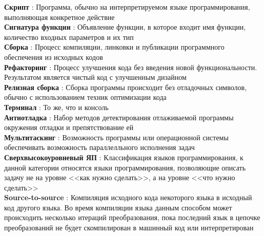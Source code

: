 \textbf{Скрипт}                  : Программа, обычно на интерпретируемом языке программирования, выполняющая конкретное действие                     \\
\textbf{Сигнатура функции}       : Объявление функции, в которое входит имя функции, количество входных параметров и их тип                          \\
\textbf{Сборка}                  : Процесс компиляции, линковки и публикации программного обеспечения из исходных кодов                              \\
\textbf{Рефакторинг}             : Процесс улучшения кода без введения новой функциональности. Результатом является чистый код с улучшенным дизайном \\
\textbf{Релизная сборка}         : Сборка программы происходит без отладочных символов, обычно с использованием техник оптимизации кода              \\
\textbf{Терминал}                : То же, что и консоль                                                                                              \\
\textbf{Антиотладка}             : Набор методов детектирования отлаживаемой программы окружения отладки и препятствование ей                        \\
\textbf{Мультитаскинг}           : Возможность программы или операционной системы обеспечивать возможность параллелльного исполнения задач           \\
\textbf{Сверхвысокоуровневый ЯП} : Классификация языков программирования, к данной категории относятся языки программирования,
позволяющие описать задачу не на уровне <<как нужно сделать>>, а на уровне <<что нужно сделать>>                                                     \\
\textbf{Source-to-source} : Компиляция исходного кода некоторого языка в исходный код другого языка. Во время компиляции языка данным способом
 может происходить несколько итераций преобразования, пока последний язык в цепочке преобразований не будет скомпилирован в машинный код или интерпретирован\\
